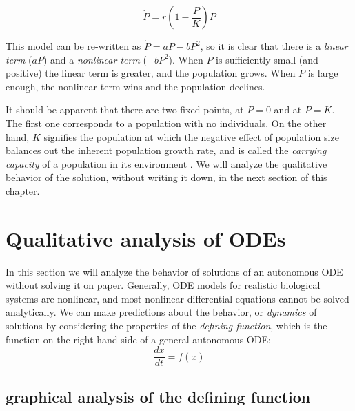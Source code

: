 \documentclass[
  letterpaper,
  DIV=11,
  numbers=noendperiod]{scrreprt}
\begin{document}
\begin{equation}
\dot P = r\left(1-\frac{P}{K}\right)P
\label{eq:log_cont_model}
\end{equation}

This model can be re-written as \(\dot P = aP -bP^2\),
so it is
clear that there is a \emph{linear term} (\(aP\)) and a \emph{nonlinear
term} (\(-bP^2\)). When \(P\) is sufficiently small (and positive) the
linear term is greater, and the population grows. When \(P\) is large
enough, the nonlinear term wins and the population declines.

It should be apparent that there are two fixed points, at \(P=0\) and at
\(P=K\). The first one corresponds to a population with no individuals.
On the other hand, \(K\) signifies the population at which the negative
effect of population size balances out the inherent population growth
rate, and is called the 
\emph{carrying capacity} of a population in its environment
\cite{otto_biologists_2007}. We will analyze the qualitative behavior of
the solution, without writing it down, in the next section of this
chapter.

\hypertarget{qualitative-analysis-of-odes}{%
\section{Qualitative analysis of
ODEs}\label{qualitative-analysis-of-odes}}

\label{sec:math16}

In this section we will analyze the behavior of solutions of an
autonomous ODE without solving it on paper. Generally, ODE models for
realistic biological systems are nonlinear, and most nonlinear
differential equations cannot be solved analytically. We can make
predictions about the behavior, or \emph{dynamics} of solutions by
considering the properties of the
 \emph{defining
function}, which is the function on the right-hand-side of a general
autonomous ODE: \[ \frac{dx}{dt} = f(x)\]

\hypertarget{graphical-analysis-of-the-defining-function}{%
\subsection{graphical analysis of the defining
function}\label{graphical-analysis-of-the-defining-function}}
\end{document}

